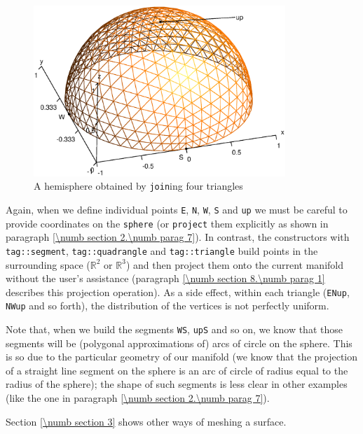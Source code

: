 \begin{figure}[ht] \centering
  \includegraphics[width=95mm]{hemisphere}
  \caption{A hemisphere obtained by {\small\tt join}ing four triangles}
\end{figure}


Again, when we define individual points {\small\tt E}, {\small\tt N}, {\small\tt W},
{\small\tt S} and {\small\tt up} we must be careful to provide coordinates on the
{\small\tt sphere} (or {\small\tt project} them explicitly as shown in paragraph
\ref{\numb section 2.\numb parag 7}).
In contrast, the {\small\tt {}} constructors with {\small\tt \textcolor{tag}{tag}::segment},
{\small\tt \textcolor{tag}{tag}::quadrangle} and {\small\tt \textcolor{tag}{tag}::triangle} build points in the
surrounding space ($ \mathbb{R}^2 $ or $ \mathbb{R}^3 $) and
then project them onto the current manifold without the user's assistance (paragraph
\ref{\numb section 8.\numb parag 1} describes this projection operation).
As a side effect, within each triangle ({\small\tt ENup}, {\small\tt NWup} and so forth),
the distribution of the vertices is not perfectly uniform.

Note that, when we build the segments {\small\tt WS}, {\small\tt upS} and so on,
we know that those segments will be (polygonal approximations of) arcs of circle on the sphere.
This is so due to the particular geometry of our manifold (we know that the projection of
a straight line segment on the sphere is an arc of circle of radius equal to the radius of
the sphere); the shape of such segments is less clear in other examples
(like the one in paragraph \ref{\numb section 2.\numb parag 7}).

Section \ref{\numb section 3} shows other ways of meshing a surface.


